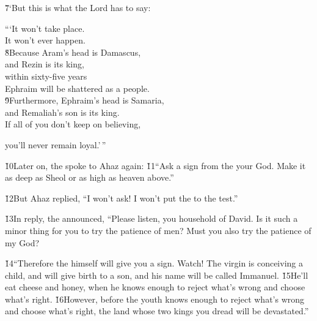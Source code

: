 \v{7}`But this is what the Lord  has to say:

\begin{poetry}
\poeml ```It won't take place. \\
\poemll    It won't ever happen. \\
\poeml \v{8}Because Aram's head is Damascus, \\
\poemll    and Rezin is its king, \\
\poeml within sixty-five years \\
\poemll    Ephraim will be shattered as a people. \\
\poeml \v{9}Furthermore, Ephraim's head is Samaria, \\
\poemll    and Remaliah's son is its king. \\
\poeml If all of you don't keep on believing,
\end{poetry}

you'll never remain loyal.'\,''

\v{10}Later on, the  spoke to Ahaz again: \v{11}``Ask a sign from the  your God. Make it as deep as Sheol or as high as heaven above.''

\v{12}But Ahaz replied, ``I won't ask! I won't put the  to the test.''

\v{13}In reply, the  announced, ``Please listen, you household of David. Is it such a minor thing for you to try the patience of men? Must you also try the patience of my God?

\v{14}``Therefore the  himself will give you a sign. Watch! The virgin is conceiving a child, and will give birth to a son, and his name will be called Immanuel. \v{15}He'll eat cheese and honey, when he knows enough to reject what's wrong and choose what's right. \v{16}However, before the youth knows enough to reject what's wrong and choose what's right, the land whose two kings you dread will be devastated.''

